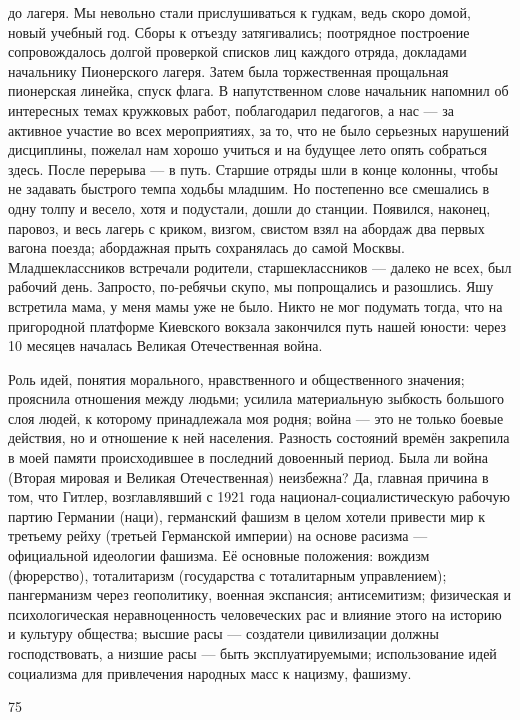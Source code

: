 \label{25-1}
до лагеря. Мы невольно стали прислушиваться к гудкам, ведь скоро домой, новый учебный год. Сборы к отъезду затягивались; поотрядное построение сопровождалось долгой проверкой списков лиц каждого отряда, докладами начальнику Пионерского лагеря. Затем была торжественная прощальная пионерская линейка, спуск флага. В напутственном слове начальник напомнил об интересных темах кружковых работ, поблагодарил педагогов, а нас — за активное участие во всех мероприятиях, за то, что не было серьезных нарушений дисциплины, пожелал нам хорошо учиться и на будущее лето опять собраться здесь. После перерыва — в путь. Старшие отряды шли в конце колонны, чтобы не задавать быстрого темпа ходьбы младшим. Но постепенно все смешались в одну толпу и весело, хотя и подустали, дошли до станции. Появился, наконец, паровоз, и весь лагерь с криком, визгом, свистом взял на абордаж два первых вагона поезда; абордажная прыть сохранялась до самой Москвы. Младшеклассников встречали родители, старшеклассников — далеко не всех, был рабочий день. Запросто, по-ребячьи скупо, мы попрощались и разошлись. Яшу встретила мама, у меня мамы уже не было. Никто не мог подумать тогда, что на пригородной платформе Киевского вокзала закончился путь нашей юности: через 10 месяцев началась Великая Отечественная война.

\label{26-1}
Роль идей, понятия морального, нравственного и общественного значения; прояснила отношения между людьми; усилила материальную зыбкость большого слоя людей, к которому принадлежала моя родня; война — это не только боевые действия, но и отношение к ней населения. Разность состояний времён закрепила в моей памяти происходившее в последний довоенный период. Была ли война (Вторая мировая и Великая Отечественная) неизбежна? Да, главная причина в том, что Гитлер, возглавлявший с 1921 года национал-социалистическую рабочую партию Германии (наци), германский фашизм в целом хотели привести мир к третьему рейху (третьей Германской империи) на основе расизма — официальной идеологии фашизма. Её основные положения: вождизм (фюрерство), тоталитаризм (государства с тоталитарным управлением); пангерманизм через геополитику, военная экспансия; антисемитизм; физическая и психологическая неравноценность человеческих рас и влияние этого на историю и культуру общества; высшие расы — создатели цивилизации должны господствовать, а низшие расы — быть эксплуатируемыми; использование идей социализма для привлечения народных масс к нацизму, фашизму.

75

